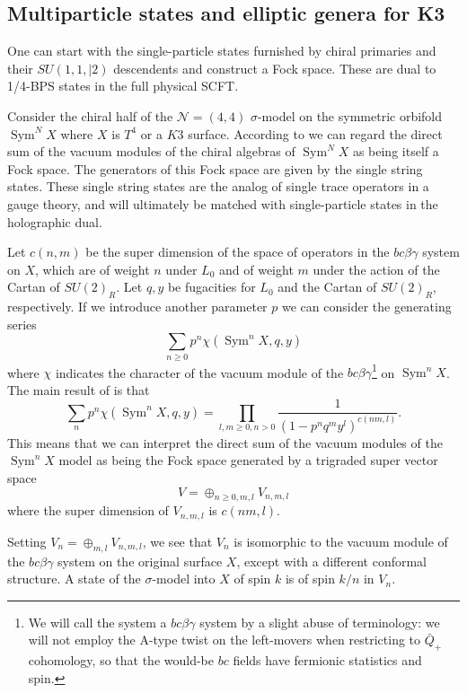 \documentclass[11pt]{amsart}
\newcommand{\mc}{\mathcal}
\DeclareMathOperator{\Sym}{Sym} \DeclareMathOperator{\Hom}{Hom}
\theoremstyle{thm}
\numberwithin{equation}{subsection}
\theoremstyle{def}
\theoremstyle{rem}
\begin{document}
\subsection{Multiparticle states and elliptic genera for K3}
One can start with the single-particle states furnished by chiral primaries and their $SU(1,1,|2)$ descendents and construct a Fock space. These are dual to 1/4-BPS states in the full physical SCFT.

Consider the chiral half of the $\mc N= (4,4)$ $\sigma$-model on the symmetric orbifold  $\Sym^N X$ where $X$ is $T^4$ or a $K3$ surface. 
 According to \cite{DMVV} we can regard the direct sum of the vacuum modules of the chiral algebras of $\Sym^N X$ as being itself a Fock space. The generators of this Fock space are given by the single string states. These single string states are the analog of single trace operators in a gauge theory, and will ultimately be matched with single-particle states in the holographic dual.

Let $c(n,m)$ be the super dimension of the space of operators in the $bc\beta\gamma$ system on $X$, which are of weight $n$ under $L_0$ and of weight $m$ under the action of the Cartan of $SU(2)_R$.  
Let $q,y$ be fugacities for $L_0$ and the Cartan of $SU(2)_R$, respectively.  
If we introduce another parameter $p$ we can consider the generating series
\begin{equation} 
	\sum_{n \geq 0} p^n \chi(\Sym^n X, q,y) 
\end{equation}
where $\chi$ indicates the character of the vacuum module of the $bc\beta\gamma$\footnote{We will call the system a $bc\beta\gamma$ system by a slight abuse of terminology: we will not employ the A-type twist on the left-movers when restricting to $\bar{Q}_+$ cohomology, so that the would-be $bc$ fields have fermionic statistics and spin.} on $\Sym^n X$.  
The main result of \cite{??} is that
\begin{equation} 
	\sum_{n} p^n \chi(\Sym^n X, q,y) = \prod_{l,m \geq 0,n >0 } \frac{1}{(1 - p^n q^m y^l)^{c(nm,l)}}. 
\end{equation}
This means that we can interpret the direct sum of the vacuum modules of the $\Sym^n X$ model as being the Fock space generated by a trigraded super vector space 
\begin{equation} 
	V =\oplus_{n \ge 0,m,l} V_{n,m,l} 
\end{equation}
where the super dimension of $V_{n,m,l}$ is $c(nm,l)$.  

Setting $V_n = \oplus_{m,l} V_{n,m,l}$, we see that $V_n$ is isomorphic to the vacuum module of the $bc\beta\gamma$ system on the original surface $X$, except with a different conformal structure.  
A state of the $\sigma$-model into $X$ of spin $k$ is of spin $k/n$ in $V_n$.  
\end{document}
